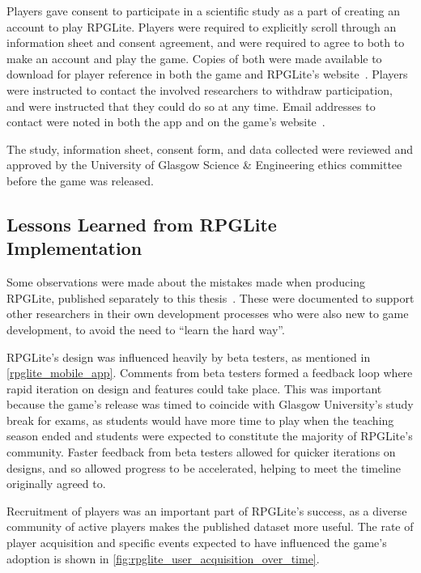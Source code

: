 Players gave consent to participate in a scientific study as a part of creating
an account to play RPGLite. Players were required to explicitly scroll through
an information sheet and consent agreement, and were required to agree to both
to make an account and play the game. Copies of both were made available to
download for player reference in both the game and RPGLite's
website~\cite{rpglite_website}. Players were instructed to contact the involved
researchers to withdraw participation, and were instructed that they could do so
at any time. Email addresses to contact were noted in both the app and on the
game's website~\cite{rpglite_website}.

The study, information sheet, consent form, and data collected were reviewed and
approved by the University of Glasgow Science \& Engineering ethics committee
before the game was released.


\subsection{Lessons Learned from RPGLite Implementation}
\label{rpglite_lessons_learned_summary}

Some observations were made about the mistakes made when producing RPGLite,
published separately to this thesis~\cite{RPGLiteLessonsLearned}. These were
documented to support other researchers in their own development processes who
were also new to game development, to avoid the need to ``learn the hard way''.

RPGLite's design was influenced heavily by beta testers, as mentioned in
\cref{rpglite_mobile_app}. Comments from beta testers formed a feedback loop
where rapid iteration on design and features could take place. This was
important because the game's release was timed to coincide with Glasgow
University's study break for exams, as students would have more time to play
when the teaching season ended and students were expected to constitute the
majority of RPGLite's community. Faster feedback from beta testers allowed for
quicker iterations on designs, and so allowed progress to be accelerated,
helping to meet the timeline originally agreed to. 


Recruitment of players was an important part of RPGLite's success, as a diverse
community of active players makes the published dataset more useful. The rate of
player acquisition and specific events expected to have influenced the game's
adoption is shown in \cref{fig:rpglite_user_acquisition_over_time}.

